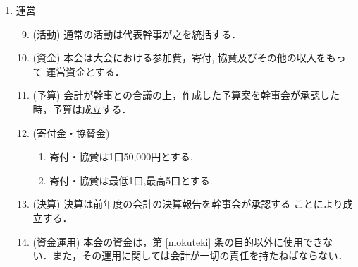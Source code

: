 \begin{enumerate}
\item	運営\\
%
\begin{enumerate}
\setcounter{enumii}{8}
\item	(活動) 通常の活動は代表幹事が之を統括する．\\
%
\item	(資金) 本会は大会における参加費，寄付, 協賛及びその他の収入をもって
運営資金とする．\\
%
\item (予算) 会計が幹事との合議の上，作成した予算案を幹事会が承認した時，予算は成立する．\\
%
\item (寄付金・協賛金) 
\begin{enumerate}
	\item	寄付・協賛は1口50,000円とする. \\
	\item	寄付・協賛は最低1口,最高5口とする. \\
\end{enumerate}
%
\item (決算) 決算は前年度の会計の決算報告を幹事会が承認する
ことにより成立する．\\
%
\item (資金運用) 本会の資金は，第 \ref{mokuteki} 条の目的以外に使用できな
い．また，その運用に関しては会計が一切の責任を持たねばならない．\\
%
\end{enumerate}
%

\end{enumerate}
